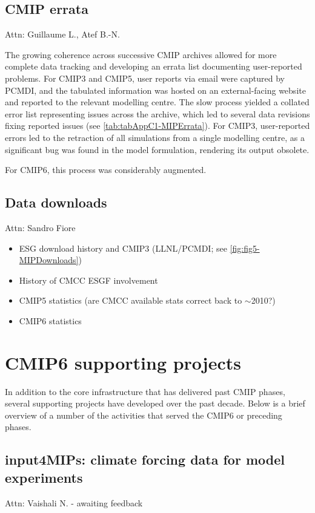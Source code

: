 \documentclass[gmd, preprint]{copernicus}
\def\cred#1{{\color{red}#1}}
\begin{document}
\subsection{CMIP errata}
\label{sec:CMIPErrata}
\cred{Attn: Guillaume L., Atef B.-N.}

The growing coherence across successive CMIP archives allowed for more complete data tracking and developing an errata list documenting user-reported problems. For CMIP3 and CMIP5, user reports via email were captured by PCMDI, and the tabulated information was hosted on an external-facing website and reported to the relevant modelling centre. The slow process yielded a collated error list representing issues across the archive, which led to several data revisions fixing reported issues (see \autoref{tab:tabAppC1-MIPErrata}). For CMIP3, user-reported errors led to the retraction of all simulations from a single modelling centre, as a significant bug was found in the model formulation, rendering its output obsolete.

\cred{For CMIP6, this process was considerably augmented.}


\subsection{Data downloads}
\label{sec:CMIPDataDownloads}
\cred{Attn: Sandro Fiore}
\cred{
\begin{itemize}
	\item ESG download history and CMIP3 (LLNL/PCMDI; see \autoref{fig:fig5-MIPDownloads})
    \item History of CMCC ESGF involvement
	\item CMIP5 statistics (are CMCC available stats correct back to $\sim$2010?)
	\item CMIP6 statistics
\end{itemize}
}


\section{CMIP6 supporting projects}
\label{sec:CMIP6SupportingProjects}
In addition to the core infrastructure that has delivered past CMIP phases, several supporting projects have developed over the past decade. Below is a brief overview of a number of the activities that served the CMIP6 or preceding phases.


\subsection{input4MIPs: climate forcing data for model experiments}
\label{sec:CMIP6SupportingProjects-input4MIPs}
\cred{Attn: Vaishali N. - awaiting feedback}
\end{document}
